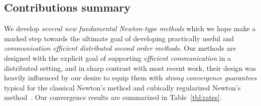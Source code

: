 \documentclass[10pt]{article}
\begin{document}
\subsection{Contributions summary}

We develop {\em several  new  fundamental Newton-type methods} which we hope make a marked step towards the ultimate goal of developing practically useful and {\em communication efficient distributed second order methods}. Our methods are designed with the explicit goal of supporting {\em efficient communication} in a distributed setting, and in sharp contrast with most recent work, their design was heavily influenced by our desire to equip them with {\em strong convergence guarantees} typical for the classical Newton's method \citep{Wallis1685, Raphson1697} and  cubically regularized Newton's method~\citep{Griewank-cubic-1981, PN2006-cubic}. Our convergence results are summarized in Table~\ref{tbl:rates}.
\end{document}
